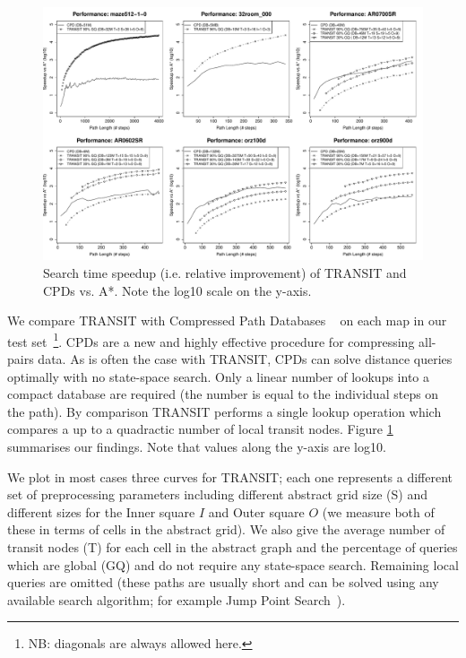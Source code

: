 \begin{figure}[tb]
   \begin{center}
	   \includegraphics[width=2.0\columnwidth, trim = 10mm 10mm 10mm 0mm]
		{diagrams/speedup.pdf}
   \end{center}
   \caption{Search time speedup (i.e. relative improvement) of TRANSIT and CPDs vs. A*. Note the log10 scale on the y-axis.}
\label{fig:speedup}
\end{figure}

We compare TRANSIT with Compressed Path Databases ~\cite{botea11}
on each map in our test set~\footnote{NB: diagonals are always allowed here.}.
CPDs are a new and highly effective procedure for compressing
all-pairs data. As is often the case with TRANSIT, CPDs can solve
distance queries optimally with no state-space search. Only a linear
number of lookups into a compact database are required
(the number is equal to the individual steps on the path).
By comparison TRANSIT performs a single lookup operation which 
compares a up to a quadractic number of local transit nodes.
Figure \ref{fig:speedup} summarises our findings.
 Note that values along the y-axis are log10.

We plot in most cases three curves for TRANSIT; each one represents
a different set of preprocessing parameters including different abstract
grid size (S) and different sizes for the Inner square $I$
and Outer square $O$ (we measure both of these in terms of
cells in the abstract grid). We also give the average number of
transit nodes (T) for each cell in the abstract graph and the percentage of
queries which are global (GQ) and do not require any state-space search.
Remaining local queries are omitted (these paths are usually short and can be
solved using any available search algorithm; for example Jump Point
Search~\cite{harabor11b}).

